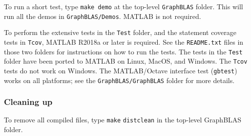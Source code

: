 To run a short test, type \verb'make demo' at the top-level \verb'GraphBLAS'
folder.  This will run all the demos in \verb'GraphBLAS/Demos'.  MATLAB is not
required.

To perform the extensive tests in the \verb'Test' folder, and the statement
coverage tests in \verb'Tcov', MATLAB R2018a or later is required.  See the
\verb'README.txt' files in those two folders for instructions on how to run the
tests.  The tests in the \verb'Test' folder have been ported to MATLAB on
Linux, MacOS, and Windows.  The \verb'Tcov' tests do not work on Windows.  The
MATLAB/Octave interface test (\verb'gbtest') works on all platforms; see the
\verb'GraphBLAS/GraphBLAS' folder for more details.

\subsubsection{Cleaning up}

To remove all compiled files, type \verb'make' \verb'distclean' in the top-level
GraphBLAS folder.

